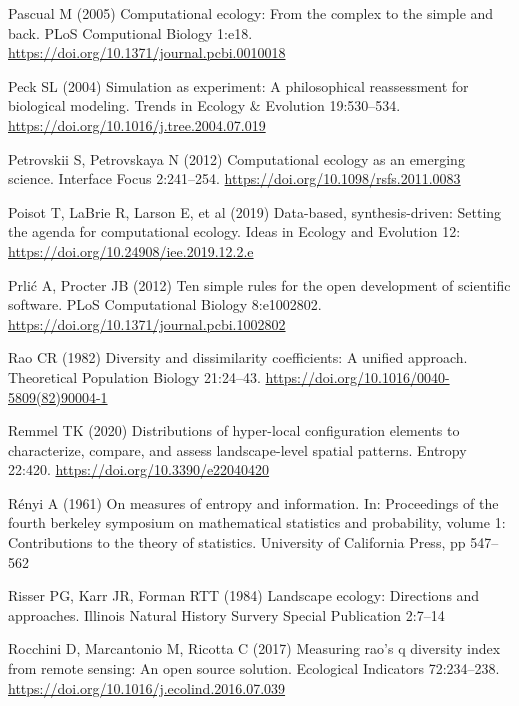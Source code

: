 \documentclass[
  12pt,
  a4paperpaper,
]{article}
\newlength{\cslhangindent}
\newenvironment{CSLReferences}[2] %
 {\begin{list}{}{%
  \setlength{\itemindent}{0pt}
  \setlength{\leftmargin}{0pt}
  \setlength{\parsep}{0pt}
  \ifodd #1
   \setlength{\leftmargin}{\cslhangindent}
   \setlength{\itemindent}{-1\cslhangindent}
  \fi
  \setlength{\itemsep}{#2\baselineskip}}}
 {\end{list}}
\begin{document}
\begin{CSLReferences}{1}{1}
Pascual M (2005) Computational ecology: From the complex to the simple
and back. PLoS Computional Biology 1:e18.
\url{https://doi.org/10.1371/journal.pcbi.0010018}

Peck SL (2004) Simulation as experiment: A philosophical reassessment
for biological modeling. Trends in Ecology \& Evolution 19:530--534.
\url{https://doi.org/10.1016/j.tree.2004.07.019}

Petrovskii S, Petrovskaya N (2012) Computational ecology as an emerging
science. Interface Focus 2:241--254.
\url{https://doi.org/10.1098/rsfs.2011.0083}

Poisot T, LaBrie R, Larson E, et al (2019) Data-based, synthesis-driven:
Setting the agenda for computational ecology. Ideas in Ecology and
Evolution 12: \url{https://doi.org/10.24908/iee.2019.12.2.e}

Prlić A, Procter JB (2012) Ten simple rules for the open development of
scientific software. PLoS Computational Biology 8:e1002802.
\url{https://doi.org/10.1371/journal.pcbi.1002802}

Rao CR (1982) Diversity and dissimilarity coefficients: A unified
approach. Theoretical Population Biology 21:24--43.
\url{https://doi.org/10.1016/0040-5809(82)90004-1}

Remmel TK (2020) Distributions of hyper-local configuration elements to
characterize, compare, and assess landscape-level spatial patterns.
Entropy 22:420. \url{https://doi.org/10.3390/e22040420}

Rényi A (1961) On measures of entropy and information. In: Proceedings
of the fourth berkeley symposium on mathematical statistics and
probability, volume 1: Contributions to the theory of statistics.
University of California Press, pp 547--562

Risser PG, Karr JR, Forman RTT (1984) Landscape ecology: Directions and
approaches. Illinois Natural History Survery Special Publication 2:7--14

Rocchini D, Marcantonio M, Ricotta C (2017) Measuring rao's q diversity
index from remote sensing: An open source solution. Ecological
Indicators 72:234--238.
\url{https://doi.org/10.1016/j.ecolind.2016.07.039}


\end{CSLReferences}
\end{document}
